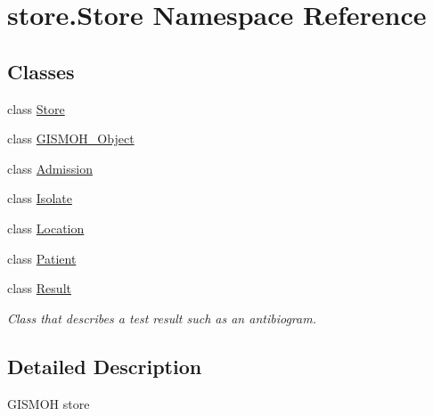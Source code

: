 \hypertarget{namespacestore_1_1_store}{\section{store.\-Store Namespace Reference}
\label{namespacestore_1_1_store}
}
\subsection*{Classes}
\begin{DoxyCompactItemize}
\item 
class \hyperlink{classstore_1_1_store_1_1_store}{Store}
\item 
class \hyperlink{classstore_1_1_store_1_1_g_i_s_m_o_h___object}{G\-I\-S\-M\-O\-H\-\_\-\-Object}
\item 
class \hyperlink{classstore_1_1_store_1_1_admission}{Admission}
\item 
class \hyperlink{classstore_1_1_store_1_1_isolate}{Isolate}
\item 
class \hyperlink{classstore_1_1_store_1_1_location}{Location}
\item 
class \hyperlink{classstore_1_1_store_1_1_patient}{Patient}
\item 
class \hyperlink{classstore_1_1_store_1_1_result}{Result}
\begin{DoxyCompactList}\small\item\em Class that describes a test result such as an antibiogram. \end{DoxyCompactList}\end{DoxyCompactItemize}


\subsection{Detailed Description}
\begin{DoxyVerb}GISMOH store
\end{DoxyVerb}
 